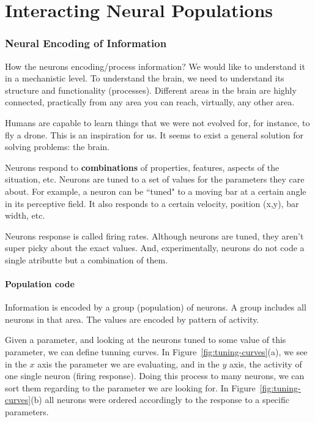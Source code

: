 \documentclass[main]{subfiles}
\begin{document}

\section{Interacting Neural Populations}

\subsubsection{Neural Encoding of Information}

How the neurons encoding/process information?
We would like to understand it in a mechanistic level.
To understand the brain, we need to understand its structure and functionality (processes).
Different areas in the brain are highly connected, practically from any area you can reach, virtually, any other area.

Humans are capable to learn things that we were not evolved for, for instance, to fly a drone.
This is an inspiration for us.
It seems to exist a general solution for solving problems: the brain.

Neurons respond to \textbf{combinations} of properties, features, aspects of the situation, etc.
Neurons are tuned to a set of values for the parameters they care about.
For example, a neuron can be ``tuned" to a moving bar at a certain angle in its perceptive field. It also responds to a certain velocity, position (x,y), bar width, etc.

Neurons response is called firing rates. Although neurons are tuned, they aren't super picky about the exact values. And, experimentally, neurons do not code a single atributte but a combination of them.

\paragraph{Population code}

Information is encoded by a group (population) of neurons. A group includes all neurons in that area. The values are encoded by pattern of activity.

Given a parameter, and looking at the neurons tuned to some value of this parameter, we can define tunning curves.
In Figure~\ref{fig:tuning-curves}(a), we see in the $x$ axis the parameter we are evaluating, and in the $y$ axis, the activity of one single neuron (firing response).
Doing this process to many neurons, we can sort them regarding to the parameter we are looking for.
In Figure~\ref{fig:tuning-curves}(b) all neurons were ordered accordingly to the response to a specific parameters.
\end{document}
